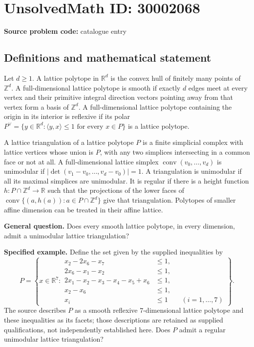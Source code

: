 \documentclass[11pt]{article}
\newcommand{\Z}{\mathbb{Z}}
\newcommand{\R}{\mathbb{R}}
\begin{document}
\section*{UnsolvedMath ID: 30002068}
\textbf{Source problem code:} catalogue entry
\subsection{Definitions and mathematical statement}
Let \(d\geq 1\). A lattice polytope in \(\R^d\) is the convex hull of finitely many points of \(\Z^d\). A full-dimensional lattice polytope is smooth if exactly \(d\) edges meet at every vertex and their primitive integral direction vectors pointing away from that vertex form a basis of \(\Z^d\). A full-dimensional lattice polytope containing the origin in its interior is reflexive if its polar \(P^\vee=\{y\in\R^d:\langle y,x\rangle\leq 1\text{ for every }x\in P\}\) is a lattice polytope.

A lattice triangulation of a lattice polytope \(P\) is a finite simplicial complex with lattice vertices whose union is \(P\), with any two simplices intersecting in a common face or not at all. A full-dimensional lattice simplex \(\operatorname{conv}(v_0,\ldots,v_d)\) is unimodular if \(\lvert\det(v_1-v_0,\ldots,v_d-v_0)\rvert=1\). A triangulation is unimodular if all its maximal simplices are unimodular. It is regular if there is a height function \(h:P\cap\Z^d\to\R\) such that the projections of the lower faces of \(\operatorname{conv}\{(a,h(a)):a\in P\cap\Z^d\}\) give that triangulation. Polytopes of smaller affine dimension can be treated in their affine lattice.

\textbf{General question.} Does every smooth lattice polytope, in every dimension, admit a unimodular lattice triangulation?

\textbf{Specified example.} Define the set given by the supplied inequalities by
\[
P=\left\{x\in\R^7:\begin{aligned}
x_2-2x_6-x_7&\leq 1,\\
2x_6-x_1-x_2&\leq 1,\\
2x_1-x_2-x_3-x_4-x_5+x_6&\leq 1,\\
x_2-x_6&\leq 1,\\
x_i&\leq 1\qquad(i=1,\ldots,7)
\end{aligned}\right\}.
\]
The source describes \(P\) as a smooth reflexive \(7\)-dimensional lattice polytope and these inequalities as its facets; those descriptions are retained as supplied qualifications, not independently established here. Does \(P\) admit a regular unimodular lattice triangulation?
\end{document}
